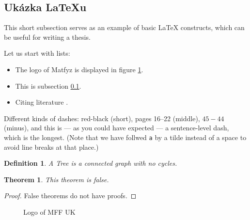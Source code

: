 
\subsection{Ukázka \LaTeX{}u}
\label{ssec:ukazka}

This short subsection serves as an example of basic \LaTeX{} constructs,
which can be useful for writing a thesis.

Let us start with lists:

\begin{itemize}
\item The logo of Matfyz is displayed in figure \ref{fig:mff}.
\item This is subsection \ref{ssec:ukazka}.
\item Citing literature \cite{lamport94}.
\end{itemize}

Different kinds of dashes:
red-black (short),
pages 16--22 (middle),
$45-44$ (minus),
and this is --- as you could have expected --- a sentence-level dash,
which is the longest.
(Note that we have follwed \verb|a| by a tilde instead of a space
to avoid line breaks at that place.)

\newtheorem{theorem}{Theorem}
\newtheorem*{define}{Definition}	%

\begin{define}
A {\sl Tree} is a connected graph with no cycles.
\end{define}

\begin{theorem}
This theorem is false.
\end{theorem}

\begin{proof}
False theorems do not have proofs.
\end{proof}

\begin{figure}
	\centering
	\caption{Logo of MFF UK}
	\label{fig:mff}
\end{figure}

